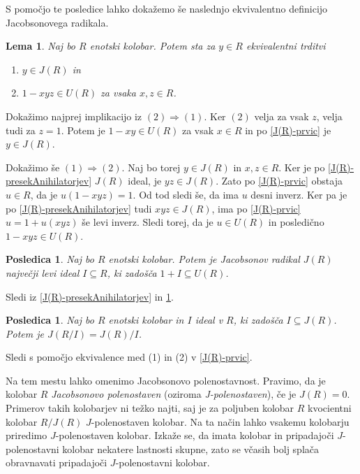 \documentclass[a4paper, 12pt]{amsart}
\theoremstyle{definition} %
\theoremstyle{plain} %
\newtheorem{lema}[definicija]{Lema}
\newtheorem{posledica}[definicija]{Posledica}
\begin{document}
S pomočjo te posledice lahko dokažemo še naslednjo ekvivalentno definicijo Jacobsonovega radikala.

\begin{lema}
\label{J(R)-drugic}
Naj bo $R$ enotski kolobar. Potem sta za $y\in R$ ekvivalentni trditvi
\begin{enumerate}
\item $y\in J(R)$ in 
\item $1 - xyz \in U(R)$ za vsaka $x,z\in R$.
\end{enumerate}
\end{lema}

\proof
Dokažimo najprej implikacijo iz $(2) \Rightarrow (1)$. Ker $(2)$ velja za vsak $z$, velja tudi za $z=1$. Potem je $1- xy\in U(R)$ za vsak $x\in R$ in po \ref{J(R)-prvic} je $y\in J(R)$. 

Dokažimo še $(1) \Rightarrow (2)$. Naj bo torej $y\in J(R)$ in $x,z\in R$. Ker je po \ref{J(R)-presekAnihilatorjev} $J(R)$ ideal, je $yz\in J(R)$. Zato po \ref{J(R)-prvic} obstaja $u\in R$, da je $u (1-xyz) = 1$. Od tod sledi še, da ima $u$ desni inverz. Ker pa je po \ref{J(R)-presekAnihilatorjev} tudi $xyz\in J(R)$, ima po \ref{J(R)-prvic}  $u = 1+ u(xyz)$ še levi inverz. Sledi torej, da je $u\in U(R)$ in posledično $1-xyz\in U(R)$.
\endproof

\begin{posledica}
Naj bo $R$ enotski kolobar. Potem je Jacobsonov radikal $J(R)$ največji levi ideal $I \subseteq R$, ki zadošča $1+I\subseteq U(R)$.
\end{posledica}

\proof
Sledi iz \ref{J(R)-presekAnihilatorjev} in \ref{J(R)-drugic}.
\endproof

\begin{posledica}
Naj bo $R$ enotski kolobar in $I$ ideal v $R$, ki zadošča $I\subseteq J(R)$. Potem je $J(R/I) = J(R)/I$.
\end{posledica}

\proof
Sledi s pomočjo ekvivalence med (1) in (2) v \ref{J(R)-prvic}.
\endproof

Na tem mestu lahko omenimo Jacobsonovo polenostavnost. Pravimo, da je kolobar $R$ \emph{Jacobsonovo polenostaven} (oziroma \emph{J-polenostaven}), če je $J(R) = 0$. Primerov takih kolobarjev ni težko najti, saj je za poljuben kolobar $R$ kvocientni kolobar $R/J(R)$ $J$-polenostaven kolobar. Na ta način lahko vsakemu kolobarju priredimo $J$-polenostaven kolobar. Izkaže se, da imata kolobar in pripadajoči $J$-polenostavni kolobar nekatere lastnosti skupne, zato se včasih bolj splača obravnavati pripadajoči $J$-polenostavni kolobar.
\end{document}
